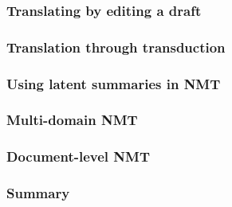 \documentclass[xetex,aspectratio=169,xcolor,professionalfonts,hyperref]{beamer}
\begin{document}
\begin{frame}
    \frametitle{Translating by editing a draft}
\end{frame}

\begin{frame}
    \frametitle{Translation through transduction}
\end{frame}

\begin{frame}
    \frametitle{Using latent summaries in NMT}
\end{frame}

\begin{frame}
    \frametitle{Multi-domain NMT}
\end{frame}

\begin{frame}
    \frametitle{Document-level NMT}
\end{frame}

\begin{frame}
    \frametitle{Summary}
\end{frame}



    
\end{document}
